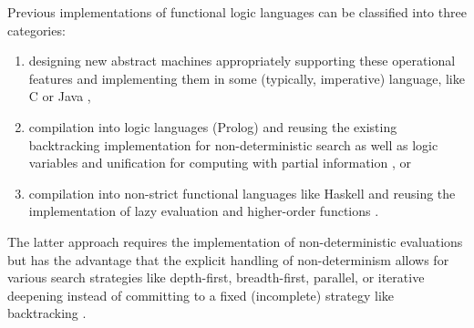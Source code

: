 \documentclass{llncs}
\begin{document}
Previous implementations of functional logic languages
can be classified into three categories:
\begin{enumerate}
 \item designing new abstract machines appropriately supporting
these operational features and implementing them in some (typically,
imperative) language, like C \cite{Lux99FLOPS}
or Java \cite{AntoyHanusLiuTolmach05,HanusSadre99JFLP},

 \item compilation into logic languages (Prolog) and reusing
the existing backtracking implementation for non-deterministic
search as well as logic variables and unification for computing with partial
information \cite{AntoyHanus00FROCOS,Lopez-FraguasSanchez-Hernandez99}, or

 \item compilation into non-strict functional languages like Haskell
and reusing the implementation
of lazy evaluation and higher-order functions
\cite{BrasselHuch07,BrasselHuch09}.
\end{enumerate}

The latter approach requires the implementation
of non-deterministic evaluations but has the advantage
that the explicit handling of non-determinism allows for
various search strategies like depth-first, breadth-first, parallel,
or iterative deepening instead of committing to a fixed (incomplete)
strategy like backtracking \cite{BrasselHuch07}.
\end{document}
